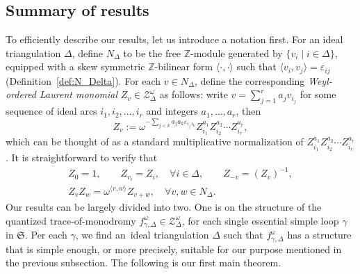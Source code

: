 \documentclass[pdftex]{sigma}
\numberwithin{equation}{section}
\theoremstyle{definition}
\begin{document}
\subsection{Summary of results}
To efficiently describe our results, let us introduce a notation first. For an ideal triangulation $\Delta$, define $N_\Delta$ to be the free $\mathbb{Z}$-module generated by $\{ v_i \mid i \in \Delta\}$, equipped with a skew symmetric $\mathbb{Z}$-bilinear form $\langle \cdot, \cdot \rangle$ such that $\langle v_i, v_j\rangle = \varepsilon_{ij}$ (Definition~\ref{def:N_Delta}). For each $v \in N_\Delta$, define the corresponding {\em Weyl-ordered Laurent monomial} $Z_v \in \mathcal{Z}^\omega_\Delta$ as follows: write $v = \sum_{j=1}^r a_j v_{i_j}$ for some sequence of ideal arcs $i_1,i_2,\dots,i_r$ and integers $a_1,\dots,a_r$, then
\[
Z_v := \omega^{- \sum_{j<k} a_j a_k \varepsilon_{i_j \, i_k} } Z_{i_1}^{a_1} Z_{i_2}^{a_2} \cdots Z_{i_r}^{a_r},
\]
which can be thought of as a standard multiplicative normalization of $Z_{i_1}^{a_1} Z_{i_2}^{a_2} \cdots Z_{i_r}^{a_r}$. It is straightforward to verify that
\begin{gather*}
Z_0 = 1, \qquad
Z_{v_i} = Z_i, \quad \forall i \in \Delta, \qquad
Z_{-v} = (Z_v)^{-1}, \\
Z_v Z_w = \omega^{\langle v,w\rangle} Z_{v+w}, \quad \forall v,w\in N_\Delta.
\end{gather*}
Our results can be largely divided into two. One is on the structure of the quantized trace-of-monodromy $f^\omega_{\gamma,\Delta} \in \mathcal{Z}^\omega_\Delta$, for each single essential simple loop $\gamma$ in $\mathfrak{S}$. Per each $\gamma$, we find an~ideal triangulation $\Delta$ such that $f^\omega_{\gamma,\Delta}$ has a structure that is simple enough, or more precisely, suitable for our purpose mentioned in the previous subsection. The following is our first main theorem.
\end{document}
